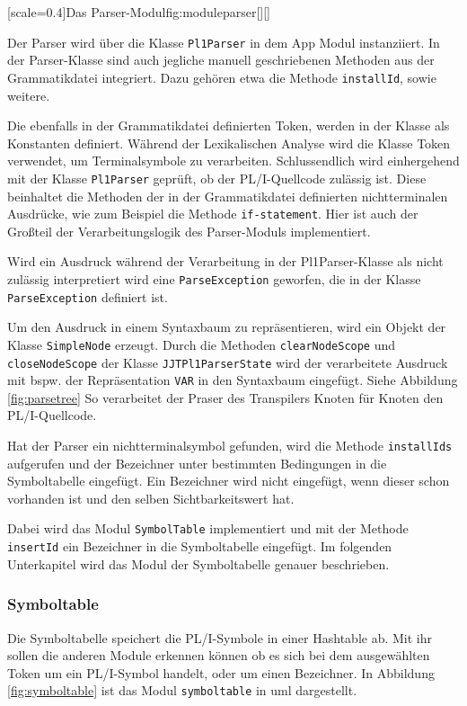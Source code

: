 [scale=0.4]{Das Parser-Modul}{fig:moduleparser}[][]
\pagebreak

Der Parser wird über die Klasse \verb+Pl1Parser+ in dem App Modul instanziiert. In der Parser-Klasse sind auch jegliche manuell geschriebenen Methoden aus der Grammatikdatei integriert. 
Dazu gehören etwa die Methode \verb+installId+, sowie weitere. 

Die ebenfalls in der Grammatikdatei definierten Token, 
werden in der Klasse  als Konstanten definiert. 
Während der Lexikalischen Analyse wird die Klasse Token verwendet, um Terminalsymbole zu verarbeiten. 
Schlussendlich wird einhergehend mit der Klasse \verb+Pl1Parser+ geprüft, ob der PL/I-Quellcode zulässig ist. 
Diese beinhaltet die Methoden der in der Grammatikdatei definierten nichtterminalen Ausdrücke, wie zum Beispiel die Methode \verb+if-statement+. 
Hier ist auch der Großteil der Verarbeitungslogik des Parser-Moduls implementiert.

Wird ein Ausdruck während der Verarbeitung in der Pl1Parser-Klasse als nicht zulässig  interpretiert wird eine \verb+ParseException+ geworfen, die in der Klasse \verb+ParseException+ definiert ist.

Um den Ausdruck in einem Syntaxbaum zu repräsentieren, wird ein Objekt der Klasse \verb+SimpleNode+ erzeugt. Durch die Methoden \verb+clearNodeScope+ und \verb+closeNodeScope+ der Klasse \verb+JJTPl1ParserState+ wird der verarbeitete Ausdruck mit bspw. der Repräsentation \verb+VAR+ in den Syntaxbaum eingefügt. 
Siehe Abbildung \ref{fig:parsetree} So verarbeitet der Praser des Transpilers Knoten für Knoten den PL/I-Quellcode. 

Hat der Parser ein nichtterminalsymbol gefunden, wird die Methode \verb+installIds+ aufgerufen und der Bezeichner unter bestimmten Bedingungen in die Symboltabelle eingefügt. 
Ein Bezeichner wird nicht eingefügt, 
wenn dieser schon vorhanden ist und den selben Sichtbarkeitswert hat.

Dabei wird das Modul \verb+SymbolTable+ implementiert und mit der Methode \verb+insertId+ ein Bezeichner in die Symboltabelle eingefügt. Im folgenden Unterkapitel wird das Modul der Symboltabelle genauer beschrieben. 

\pagebreak
\subsubsection{Symboltable}
Die Symboltabelle speichert die PL/I-Symbole in einer Hashtable ab. Mit ihr sollen die anderen Module
erkennen können ob es sich bei dem ausgewählten Token um ein PL/I-Symbol handelt, oder um einen Bezeichner.
In Abbildung \ref{fig:symboltable} ist das Modul \verb+symboltable+ in \ac{uml} dargestellt.

